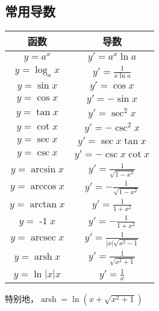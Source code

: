 \documentclass[12pt , a4paper , oneside]{ctexart}
\begin{document}
        \subsection{常用导数}
        \begin{center}
            \begin{tabular}{c|c}
                \toprule
                \textbf{函数} & \textbf{导数} \\  %
                \midrule
                $y = a^x$ & $y' = a^x \ln a$ \\  %
                \midrule
                $y = \log_a x$ & $y' = \frac{1}{x \ln a}$ \\  %
                \midrule
                $y = \sin x$ & $y' = \cos x$ \\  %
                \midrule
                $y = \cos x$ & $y' = -\sin x$ \\  %
                \midrule
                $y = \tan x$ & $y' = \sec^2 x$ \\  %
                \midrule
                $y = \cot x$ & $y' = -\csc^2 x$ \\  %
                \midrule
                $y = \sec x$ & $y' = \sec x \tan x$ \\  %
                \midrule
                $y = \csc x$ & $y' = -\csc x \cot x$ \\  %
                \midrule
                $y = \arcsin x$ & $y' = \frac{1}{\sqrt{1-x^2}}$ \\  %
                \midrule
                $y = \arccos x$ & $y' = -\frac{1}{\sqrt{1-x^2}}$ \\  %
                \midrule
                $y = \arctan x$ & $y' = \frac{1}{1+x^2}$ \\  %
                \midrule
                $y = \operatorname{-1} x$ & $y' = -\frac{1}{1+x^2}$ \\  %
                \midrule
                $y = \operatorname{arcsec} x$ & $y' = \frac{1}{|x|\sqrt{x^2-1}}$ \\  %
                \midrule
                $y = \operatorname{arsh} x$ & $y' = \frac{1}{\sqrt{x^2+1}}$ \\  %
                \midrule
                $y = \ln{|x|} x$ & $y' = \frac{1}{x}$ \\  %
                \bottomrule
            \end{tabular}
            \end{center}
            特别地，$\operatorname{arsh} = \ln{(x+\sqrt{x^2+1})}$
\end{document}
